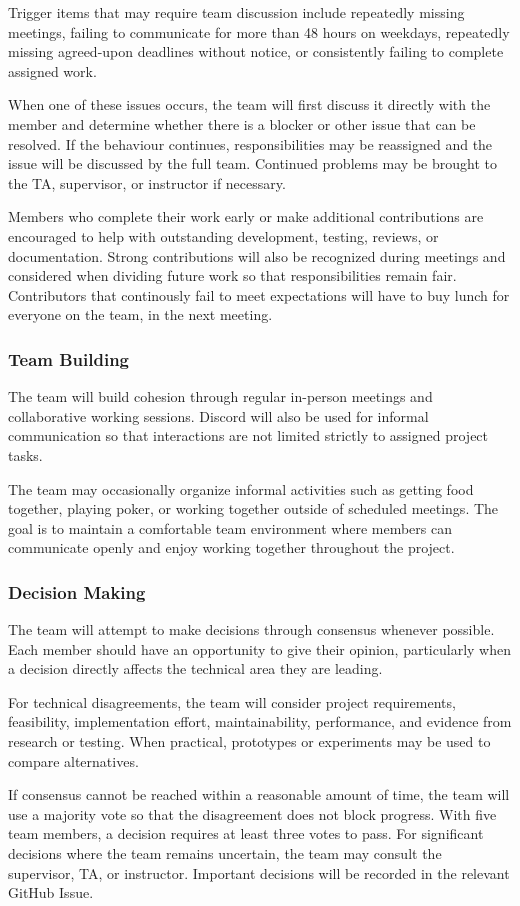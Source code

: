 \documentclass{article}
\begin{document}
Trigger items that may require team discussion include repeatedly missing meetings, failing to communicate for more than 48 hours on weekdays, repeatedly missing agreed-upon deadlines without notice, or consistently failing to complete assigned work.

When one of these issues occurs, the team will first discuss it directly with the member and determine whether there is a blocker or other issue that can be resolved. If the behaviour continues, responsibilities may be reassigned and the issue will be discussed by the full team. Continued problems may be brought to the TA, supervisor, or instructor if necessary.

Members who complete their work early or make additional contributions are encouraged to help with outstanding development, testing, reviews, or documentation. Strong contributions will also be recognized during meetings and considered when dividing future work so that responsibilities remain fair. Contributors that continously fail to meet expectations will have to buy lunch for everyone on the team, in the next meeting.

\subsubsection*{Team Building}

The team will build cohesion through regular in-person meetings and collaborative working sessions. Discord will also be used for informal communication so that interactions are not limited strictly to assigned project tasks.

The team may occasionally organize informal activities such as getting food together, playing poker, or working together outside of scheduled meetings. The goal is to maintain a comfortable team environment where members can communicate openly and enjoy working together throughout the project.

\subsubsection*{Decision Making} 

The team will attempt to make decisions through consensus whenever possible. Each member should have an opportunity to give their opinion, particularly when a decision directly affects the technical area they are leading.

For technical disagreements, the team will consider project requirements, feasibility, implementation effort, maintainability, performance, and evidence from research or testing. When practical, prototypes or experiments may be used to compare alternatives.

If consensus cannot be reached within a reasonable amount of time, the team will use a majority vote so that the disagreement does not block progress. With five team members, a decision requires at least three votes to pass. For significant decisions where the team remains uncertain, the team may consult the supervisor, TA, or instructor. Important decisions will be recorded in the relevant GitHub Issue.
\end{document}
